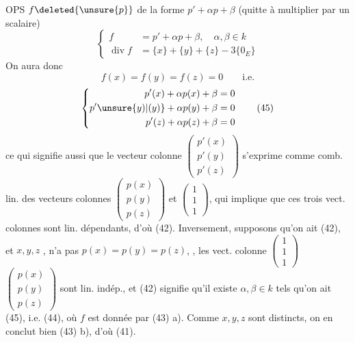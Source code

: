 OPS $f\deleted{\unsure{p}}$ de la forme $p'+\alpha p+\beta$ (quitte à multiplier par un scalaire)
\[
 \left\{\begin{aligned}
 f&=p'+\alpha p+\beta,\quad \alpha,\beta\in k\\
 \operatorname{div} f&=\{x\}+\{y\}+\{z\}-3\{0_E\}
 \end{aligned}\right. \tag*{(43)}
\]
On aura donc
\[
 f(x)=f(y)=f(z)=0\qquad\text{i.e.} \tag*{(44)}
\]
\[
 \left\{\begin{aligned}
 p'(x)+\alpha p(x)+\beta&=0\\
 p'\unsure{y)|(y)}+\alpha p(y)+\beta&=0\\
 p'(z)+\alpha p(z)+\beta&=0
 \end{aligned}\right. \tag*{(45)}
\]
ce qui signifie aussi que le vecteur colonne $\begin{pmatrix}p'(x)\\p'(y)\\p'(z)\end{pmatrix}$ s'exprime comme comb. lin. des vecteurs colonnes $\begin{pmatrix}p(x)\\p(y)\\p(z)\end{pmatrix}$ et $\begin{pmatrix}1\\1\\1\end{pmatrix}$,  qui implique que ces trois vect. colonnes sont lin. dépendants, d'où (42). Inversement, supposons qu'on ait (42), et $x,y,z$  ,    n'a pas $p(x)=p(y)=p(z)$,  ,    les vect. colonne $\begin{pmatrix}1\\1\\1\end{pmatrix}$ $\begin{pmatrix}p(x)\\p(y)\\p(z)\end{pmatrix}$ sont lin. indép., et (42) signifie qu'il existe $\alpha,\beta\in k$ tels qu'on ait (45), i.e. (44), où $f$ est donnée par (43) a). Comme $x,y,z$ sont distincts, on en conclut bien (43) b), d'où (41).
